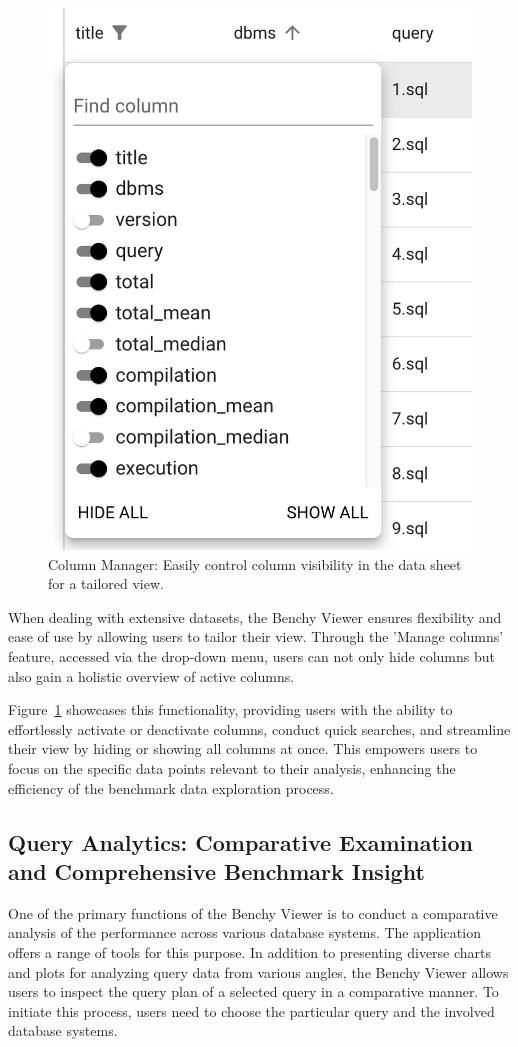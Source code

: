 
\begin{figure}[h]
  \centering
  \includegraphics[width=0.35\linewidth]{figures/data-viewer-manage-columns.png}
  \caption{Column Manager: Easily control column visibility in the data sheet for a tailored view.}
  \label{fig:data-viewer-manage-columns}
\end{figure}

When dealing with extensive datasets, the Benchy Viewer ensures flexibility and ease of use by allowing users to tailor their view. Through the 'Manage columns' feature, accessed via the drop-down menu, users can not only hide columns but also gain a holistic overview of active columns. 

Figure~\ref{fig:data-viewer-manage-columns} showcases this functionality, providing users with the ability to effortlessly activate or deactivate columns, conduct quick searches, and streamline their view by hiding or showing all columns at once. This empowers users to focus on the specific data points relevant to their analysis, enhancing the efficiency of the benchmark data exploration process.




\subsection{Query Analytics: Comparative Examination and Comprehensive Benchmark Insight }\label{sec:query-analytics}

One of the primary functions of the Benchy Viewer is to conduct a comparative analysis of the performance across various database systems. The application offers a range of tools for this purpose. In addition to presenting diverse charts and plots for analyzing query data from various angles, the Benchy Viewer allows users to inspect the query plan of a selected query in a comparative manner. To initiate this process, users need to choose the particular query and the involved database systems.

